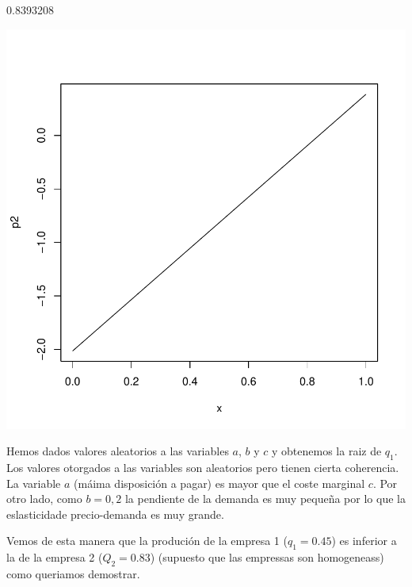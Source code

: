 \documentclass{article}
\begin{document}
\begin{Schunk}
\begin{Soutput}
[1] 0.8393208
\end{Soutput}
\end{Schunk}
\includegraphics{PUTAPRUEBA-004}



Hemos dados valores aleatorios a las variables $a$, $b$ y $c$ y obtenemos la raiz de $q_1$. Los valores otorgados a las variables son aleatorios pero tienen cierta coherencia. La variable $a$ (m\'aima disposici\'on a pagar) es mayor que el coste marginal $c$. Por otro lado, como $b=0,2$ la pendiente de la demanda es muy pequeña por lo que la eslasticidade precio-demanda es muy grande.

Vemos de esta manera que la produci\'on de la empresa 1 ($q_1=0.45$) es inferior a la de la empresa 2 ($Q_2=0.83$) (supuesto que las empressas son homogeneass) como queriamos demostrar.
\end{document}
